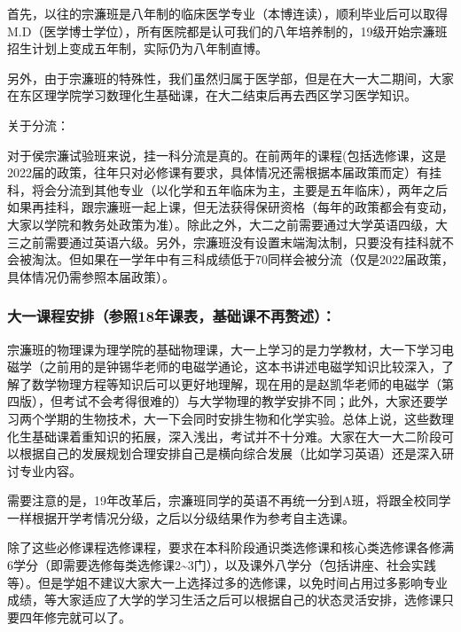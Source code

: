 \documentclass[
decoration,  %
]{qyxf-book}
\begin{document}
首先，以往的宗濂班是八年制的临床医学专业（本博连读），顺利毕业后可以取得M.D（医学博士学位），所有医院都是认可我们的八年培养制的，19级开始宗濂班招生计划上变成五年制，实际仍为八年制直博。

另外，由于宗濂班的特殊性，我们虽然归属于医学部，但是在大一大二期间，大家在东区理学院学习数理化生基础课，在大二结束后再去西区学习医学知识。

关于分流：

对于侯宗濂试验班来说，挂一科分流是真的。在前两年的课程(包括选修课，这是2022届的政策，往年只对必修课有要求，具体情况还需根据本届政策而定）有挂科，将会分流到其他专业（以化学和五年临床为主，主要是五年临床），两年之后如果再挂科，跟宗濂班一起上课，但无法获得保研资格（每年的政策都会有变动，大家以学院和教务处政策为准）。除此之外，大二之前需要通过大学英语四级，大三之前需要通过英语六级。另外，宗濂班没有设置末端淘汰制，只要没有挂科就不会被淘汰。但如果在一学年中有三科成绩低于70同样会被分流（仅是2022届政策，具体情况仍需参照本届政策）。

\hypertarget{ux5927ux4e00ux8bfeux7a0bux5b89ux6392ux53c2ux716718ux5e74ux8bfeux8868ux57faux7840ux8bfeux4e0dux518dux8d58ux8ff0}{%
	\subsubsection{大一课程安排（参照18年课表，基础课不再赘述）：}\label{ux5927ux4e00ux8bfeux7a0bux5b89ux6392ux53c2ux716718ux5e74ux8bfeux8868ux57faux7840ux8bfeux4e0dux518dux8d58ux8ff0}}

宗濂班的物理课为理学院的基础物理课，大一上学习的是力学教材，大一下学习电磁学（之前用的是钟锡华老师的电磁学通论，这本书讲述电磁学知识比较深入，了解了数学物理方程等知识后可以更好地理解，现在用的是赵凯华老师的电磁学（第四版），但考试不会考得很难的）与大学物理的教学安排不同；此外，大家还要学习两个学期的生物技术，大一下会同时安排生物和化学实验。总体上说，这些数理化生基础课着重知识的拓展，深入浅出，考试并不十分难。大家在大一大二阶段可以根据自己的发展规划合理安排自己是横向综合发展（比如学习英语）还是深入研讨专业内容。

需要注意的是，19年改革后，宗濂班同学的英语不再统一分到A班，将跟全校同学一样根据开学考情况分级，之后以分级结果作为参考自主选课。

除了这些必修课程选修课程，要求在本科阶段通识类选修课和核心类选修课各修满6学分（即需要选修每类选修课2\textasciitilde{}3门），以及课外八学分（包括讲座、社会实践等）。但是学姐不建议大家大一上选择过多的选修课，以免时间占用过多影响专业成绩，等大家适应了大学的学习生活之后可以根据自己的状态灵活安排，选修课只要四年修完就可以了。
\end{document}
